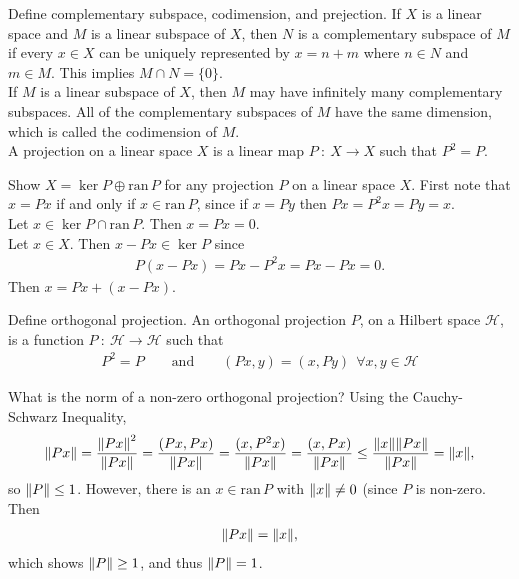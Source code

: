 \documentclass[avery5388,grid,frame]{flashcards}
\newcommand{\ran}{\mathrm{ran}\,}
\newcommand{\f}[3]{#1\ :\ #2 \rightarrow #3}
\def\hilb{\mathcal{H}}
\begin{document}


\begin{flashcard}
    {Define complementary subspace, codimension, and prejection.}
    If $X$ is a linear space and $M$ is a linear subspace of $X$, then $N$ is a complementary subspace of $M$ if every $x \in X$ can be uniquely represented by $x = n + m$ where $n \in N$ and $m \in M$.  This implies $M \cap N = \{0\}$. \\

    If $M$ is a linear subspace of $X$, then $M$ may have infinitely many complementary subspaces.  All of the complementary subspaces of $M$ have the same dimension, which is called the codimension of $M$. \\

    A projection on a linear space $X$ is a linear map $\f{P}{X}{X}$ such that $P^2 = P$.
\end{flashcard}

\begin{flashcard}
    {Show $X = \ker P \oplus \ran P$ for any projection $P$ on a linear space $X$.}
    First note that $x = Px$ if and only if $x \in \ran P$, since if $x = Py$ then $Px = P^2x = Py = x$. \\

    Let $x \in \ker P \cap \ran P$.  Then $x = Px = 0$. \\

    Let $x \in X$.  Then $x - Px \in \ker P$ since
    \begin{align*}
        P(x - Px) = Px - P^2x = Px - Px = 0.
    \end{align*}
    Then $x = Px + (x - Px)$.
\end{flashcard}

\begin{flashcard}
    {Define orthogonal projection.}
    An orthogonal projection $P$, on a Hilbert space $\hilb$, is a function $\f{P}{\hilb}{\hilb}$ such that
    \begin{align*}
        P^2 = P \qquad \text{and} \qquad (Px, y) = (x, Py) \ \ \forall x, y \in \hilb
    \end{align*}
\end{flashcard}

\begin{flashcard}
    {What is the norm of a non-zero orthogonal projection?}
    Using the Cauchy-Schwarz Inequality,
    \begin{align*}
        \norm{Px} = \frac{\norm{Px}^2}{\norm{Px}} = \frac{(Px, Px)}{\norm{Px}} = \frac{(x, P^2x)}{\norm{Px}} = \frac{(x, Px)}{\norm{Px}} \leq \frac{\norm{x}\norm{Px}}{\norm{Px}} = \norm{x},
    \end{align*}
    so $\norm{P} \leq 1$.  However, there is an $x \in \ran P$ with $\norm{x} \neq 0$ (since $P$ is non-zero.  Then
    \begin{align*}
        \norm{Px} = \norm{x},
    \end{align*}
    which shows $\norm{P} \geq 1$, and thus $\norm{P} = 1$.
\end{flashcard}
\end{document}
